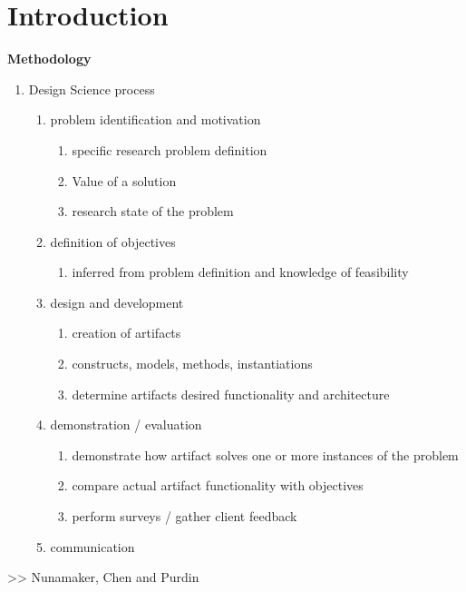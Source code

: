 
\chapter{Introduction} %
\label{cha:motivation}

\textbf{Methodology}
\begin{enumerate}
  \item Design Science process \cite{Peffer}
  \begin{enumerate}
    \item problem identification and motivation
      \begin{enumerate}
        \item specific research problem definition
        \item Value of a solution
        \item research state of the problem
      \end{enumerate}
    \item definition of objectives
      \begin{enumerate}
        \item inferred from problem definition and knowledge of feasibility
      \end{enumerate}
    \item design and development
      \begin{enumerate}
        \item creation of artifacts
        \item constructs, models, methods, instantiations
        \item determine artifacts desired functionality and architecture
      \end{enumerate}
    \item demonstration / evaluation
      \begin{enumerate}
        \item demonstrate how artifact solves one or more instances of the problem
        \item compare actual artifact functionality with objectives
        \item perform surveys / gather client feedback
      \end{enumerate}
    \item communication
  \end{enumerate}
\end{enumerate}

>> Nunamaker, Chen and Purdin



